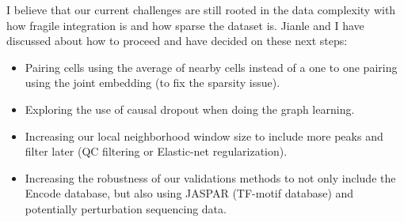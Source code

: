 \documentclass[11pt]{article}
\begin{document}
I believe that our current challenges are still rooted in the data complexity with how fragile integration is and how sparse the dataset is.
Jianle and I have discussed about how to proceed and have decided on these next steps:
\begin{itemize}
    \item Pairing cells using the average of nearby cells instead of a one to one pairing using the joint embedding (to fix the sparsity issue).
    \item Exploring the use of causal dropout when doing the graph learning.
    \item Increasing our local neighborhood window size to include more peaks and filter later (QC filtering or Elastic-net regularization).
    \item Increasing the robustness of our validations methods to not only include the Encode database, but also using JASPAR (TF-motif database) and potentially perturbation sequencing data. 
\end{itemize}
\end{document}
